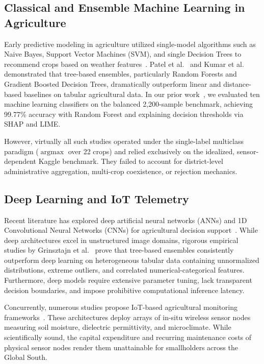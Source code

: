 \documentclass[conference]{IEEEtran}
\begin{document}
\subsection{Classical and Ensemble Machine Learning in Agriculture}
Early predictive modeling in agriculture utilized single-model algorithms such as Naive Bayes, Support Vector Machines (SVM), and single Decision Trees to recommend crops based on weather features~\cite{patel2020crop}. Patel et al.~\cite{patel2020crop} and Kumar et al.~\cite{kumar2021machine} demonstrated that tree-based ensembles, particularly Random Forests and Gradient Boosted Decision Trees, dramatically outperform linear and distance-based baselines on tabular agricultural data. In our prior work~\cite{mishra2026explainable}, we evaluated ten machine learning classifiers on the balanced 2,200-sample benchmark, achieving 99.77\% accuracy with Random Forest and explaining decision thresholds via SHAP and LIME.

However, virtually all such studies operated under the single-label multiclass paradigm ($\operatorname{argmax}$ over 22 crops) and relied exclusively on the idealized, sensor-dependent Kaggle benchmark. They failed to account for district-level administrative aggregation, multi-crop coexistence, or rejection mechanics.

\subsection{Deep Learning and IoT Telemetry}
Recent literature has explored deep artificial neural networks (ANNs) and 1D Convolutional Neural Networks (CNNs) for agricultural decision support~\cite{sharma2023deep,kamilaris2018deep}. While deep architectures excel in unstructured image domains, rigorous empirical studies by Grinsztajn et al.~\cite{grinsztajn2022why} prove that tree-based ensembles consistently outperform deep learning on heterogeneous tabular data containing unnormalized distributions, extreme outliers, and correlated numerical-categorical features. Furthermore, deep models require extensive parameter tuning, lack transparent decision boundaries, and impose prohibitive computational inference latency.

Concurrently, numerous studies propose IoT-based agricultural monitoring frameworks~\cite{rao2022iot,koksal2020crop}. These architectures deploy arrays of in-situ wireless sensor nodes measuring soil moisture, dielectric permittivity, and microclimate. While scientifically sound, the capital expenditure and recurring maintenance costs of physical sensor nodes render them unattainable for smallholders across the Global South.
\end{document}
